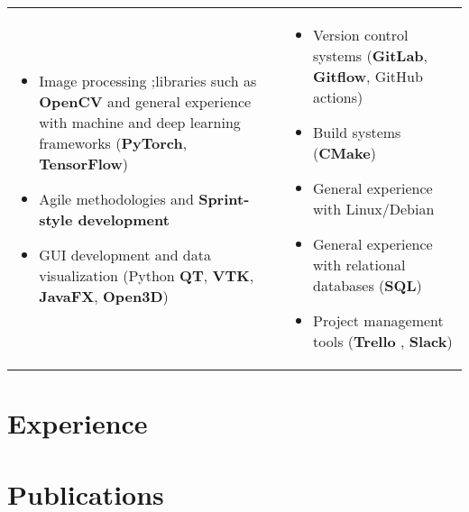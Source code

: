 \documentclass[letterpaper]{twentysecondcv} %
\begin{document}
\begin{tabularx}{\linewidth}{XX}
	\begin{itemize}
		\item Image processing ;libraries such as \textbf{OpenCV} and general experience with machine and deep learning frameworks (\textbf{PyTorch}, \textbf{TensorFlow})
		\item Agile methodologies and \textbf{Sprint-style development}
		\item GUI development and data visualization (Python \textbf{QT}, \textbf{VTK}, \textbf{JavaFX}, \textbf{Open3D})
	\end{itemize} & 
	\begin{itemize}
		\item Version control systems (\textbf{GitLab}, \textbf{Gitflow}, GitHub actions)
		\item Build systems (\textbf{CMake})
		\item General experience with Linux/Debian
		\item General experience with relational databases (\textbf{SQL})
		\item Project management tools (\textbf{Trello} , \textbf{Slack})
	\end{itemize} \\
\end{tabularx}





\section*{Experience}

\experience





\section*{Publications}

\publications
\end{document}
